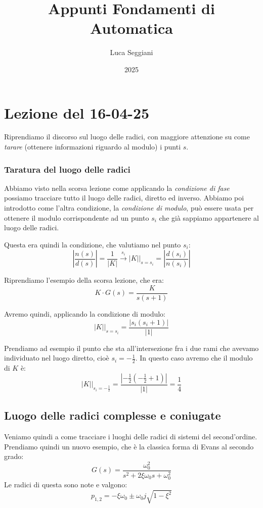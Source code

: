 \documentclass[a4paper,11pt]{article}
\title{Appunti Fondamenti di Automatica}
\author{Luca Seggiani}
\date{2025}
\begin{document}
\section{Lezione del 16-04-25}

\thispagestyle{empty}
\pagestyle{fancy}

Riprendiamo il discorso sul luogo delle radici, con maggiore attenzione su come \textit{tarare} (ottenere informazioni riguardo al modulo) i punti $s$.

\subsubsection{Taratura del luogo delle radici}
Abbiamo visto nella scorsa lezione come applicando la \textit{condizione di fase} possiamo tracciare tutto il luogo delle radici, diretto ed inverso.
Abbiamo poi introdotto come l'altra condizione, la \textit{condizione di modulo}, può essere usata per ottenere il modulo corrispondente ad un punto $s_i$ che già sappiamo appartenere al luogo delle radici.

Questa era quindi la condizione, che valutiamo nel punto $s_i$:
$$
\left| \frac{n(s)}{d(s)} \right| = \frac{1}{|K|} \xrightarrow{s_i} |K| \big|_{s = s_i} = \left| \frac{d(s_i)}{n(s_i)} \right|
$$

Riprendiamo l'esempio della scorsa lezione, che era:
$$
K \cdot G(s) = \frac{K}{s (s + 1)}
$$

Avremo quindi, applicando la condizione di modulo:
$$
|K| \big|_{s = s_i} = \frac{|s_i (s_i + 1)|}{|1|}
$$

Prendiamo ad esempio il punto che sta all'intersezione fra i due rami che avevamo individuato nel luogo diretto, cioè $s_i = -\frac{1}{2}$.
In questo caso avremo che il modulo di $K$ è:
$$
|K| \Big|_{s_i = -\frac{1}{2}} = \frac{\left|-\frac{1}{2} (-\frac{1}{2} + 1)\right|}{|1|} = \frac{1}{4}
$$

\subsection{Luogo delle radici complesse e coniugate}
Veniamo quindi a come tracciare i luoghi delle radici di sistemi del second'ordine.
Prendiamo quindi un nuovo esempio, che è la classica forma di Evans al secondo grado:
$$
G(s) = \frac{\omega_0^2}{s^2 + 2 \xi \omega_0 s + \omega_0 ^2}
$$
Le radici di questa sono note e valgono:
$$
p_{1, 2} = -\xi \omega_0 \pm \omega_0 j \sqrt{1 - \xi^2}
$$
\end{document}
